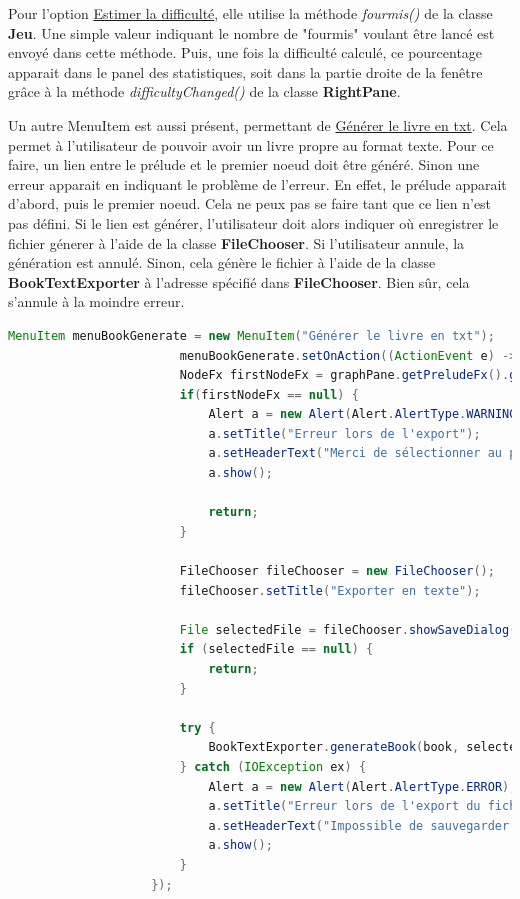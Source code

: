 				Pour l'option \underline{Estimer la difficulté}, elle utilise la méthode \textit{fourmis()} de la classe \textbf{Jeu}. Une simple valeur indiquant le nombre de "fourmis" voulant être lancé est envoyé dans cette méthode. Puis, une fois la difficulté calculé, ce pourcentage apparait dans le panel des statistiques, soit dans la partie droite de la fenêtre grâce à la méthode \textit{difficultyChanged()} de la classe \textbf{RightPane}.

				Un autre MenuItem est aussi présent, permettant de \underline{Générer le livre en txt}. Cela permet à l'utilisateur de pouvoir avoir un livre propre au format texte.
				Pour ce faire, un lien entre le prélude et le premier noeud doit être généré. Sinon une erreur apparait en indiquant le problème de l'erreur. En effet, le prélude apparait d'abord, puis le premier noeud. Cela ne peux pas se faire tant que ce lien n'est pas défini. Si le lien est générer, l'utilisateur doit alors indiquer où enregistrer le fichier génerer à l'aide de la classe \textbf{FileChooser}. Si l'utilisateur annule, la génération est annulé. Sinon, cela génère le fichier à l'aide de la classe \textbf{BookTextExporter} à l'adresse spécifié dans \textbf{FileChooser}. Bien sûr, cela s'annule à la moindre erreur.

				\begin{lstlisting}[gobble=12, language=java, caption=Génération du livre en txt]
					MenuItem menuBookGenerate = new MenuItem("Générer le livre en txt");
						menuBookGenerate.setOnAction((ActionEvent e) -> {
						NodeFx firstNodeFx = graphPane.getPreludeFx().getFirstNode();
						if(firstNodeFx == null) {
							Alert a = new Alert(Alert.AlertType.WARNING);
							a.setTitle("Erreur lors de l'export");
							a.setHeaderText("Merci de sélectionner au préalable le noeud de départ");
							a.show();

							return;
						}

						FileChooser fileChooser = new FileChooser();
						fileChooser.setTitle("Exporter en texte");

						File selectedFile = fileChooser.showSaveDialog(this);
						if (selectedFile == null) {
							return;
						}

						try {
							BookTextExporter.generateBook(book, selectedFile.getAbsolutePath());
						} catch (IOException ex) {
							Alert a = new Alert(Alert.AlertType.ERROR);
							a.setTitle("Erreur lors de l'export du fichier");
							a.setHeaderText("Impossible de sauvegarder le fichier sur le disque");
							a.show();
						}
					});
				\end{lstlisting}

